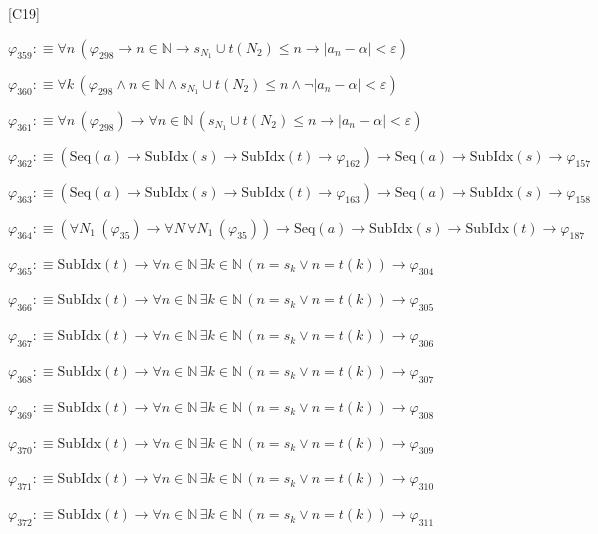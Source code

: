 \begin{fullproof}{[C19]}
\begin{abbrevlist}
\item $\varphi_{359} :\equiv \forall n\,(\varphi_{298} \to n \in \mathbb{N} \to s_{N_{1}} \cup t(N_{2}) \leq n \to \lvert a_{n} - \alpha \rvert < \varepsilon)$
\item $\varphi_{360} :\equiv \forall k\,(\varphi_{298} \land n \in \mathbb{N} \land s_{N_{1}} \cup t(N_{2}) \leq n \land \neg \lvert a_{n} - \alpha \rvert < \varepsilon)$
\item $\varphi_{361} :\equiv \forall n\,(\varphi_{298}) \to \forall n \in \mathbb{N}\,(s_{N_{1}} \cup t(N_{2}) \leq n \to \lvert a_{n} - \alpha \rvert < \varepsilon)$
\item $\varphi_{362} :\equiv (\mathrm{Seq}(a) \to \mathrm{SubIdx}(s) \to \mathrm{SubIdx}(t) \to \varphi_{162}) \to \mathrm{Seq}(a) \to \mathrm{SubIdx}(s) \to \varphi_{157}$
\item $\varphi_{363} :\equiv (\mathrm{Seq}(a) \to \mathrm{SubIdx}(s) \to \mathrm{SubIdx}(t) \to \varphi_{163}) \to \mathrm{Seq}(a) \to \mathrm{SubIdx}(s) \to \varphi_{158}$
\item $\varphi_{364} :\equiv (\forall N_{1}\,(\varphi_{35}) \to \forall N\,\forall N_{1}\,(\varphi_{35})) \to \mathrm{Seq}(a) \to \mathrm{SubIdx}(s) \to \mathrm{SubIdx}(t) \to \varphi_{187}$
\item $\varphi_{365} :\equiv \mathrm{SubIdx}(t) \to \forall n \in \mathbb{N}\,\exists k \in \mathbb{N}\,(n = s_{k} \lor n = t(k)) \to \varphi_{304}$
\item $\varphi_{366} :\equiv \mathrm{SubIdx}(t) \to \forall n \in \mathbb{N}\,\exists k \in \mathbb{N}\,(n = s_{k} \lor n = t(k)) \to \varphi_{305}$
\item $\varphi_{367} :\equiv \mathrm{SubIdx}(t) \to \forall n \in \mathbb{N}\,\exists k \in \mathbb{N}\,(n = s_{k} \lor n = t(k)) \to \varphi_{306}$
\item $\varphi_{368} :\equiv \mathrm{SubIdx}(t) \to \forall n \in \mathbb{N}\,\exists k \in \mathbb{N}\,(n = s_{k} \lor n = t(k)) \to \varphi_{307}$
\item $\varphi_{369} :\equiv \mathrm{SubIdx}(t) \to \forall n \in \mathbb{N}\,\exists k \in \mathbb{N}\,(n = s_{k} \lor n = t(k)) \to \varphi_{308}$
\item $\varphi_{370} :\equiv \mathrm{SubIdx}(t) \to \forall n \in \mathbb{N}\,\exists k \in \mathbb{N}\,(n = s_{k} \lor n = t(k)) \to \varphi_{309}$
\item $\varphi_{371} :\equiv \mathrm{SubIdx}(t) \to \forall n \in \mathbb{N}\,\exists k \in \mathbb{N}\,(n = s_{k} \lor n = t(k)) \to \varphi_{310}$
\item $\varphi_{372} :\equiv \mathrm{SubIdx}(t) \to \forall n \in \mathbb{N}\,\exists k \in \mathbb{N}\,(n = s_{k} \lor n = t(k)) \to \varphi_{311}$

\end{abbrevlist}
\end{fullproof}
